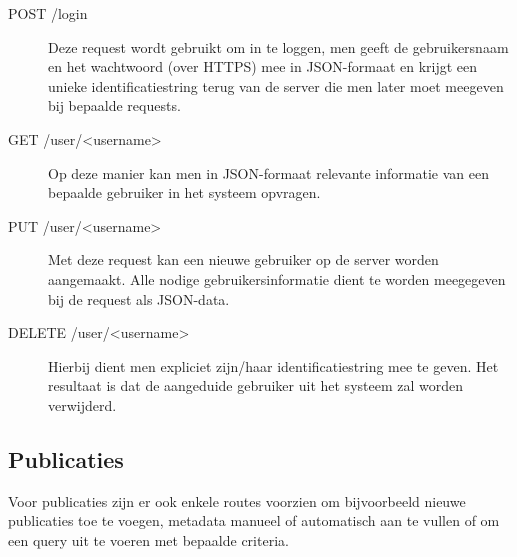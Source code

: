 \documentclass{article}
\begin{document}
\begin{description}

\item[POST /login] Deze request wordt gebruikt om in te loggen, men geeft de gebruikersnaam en het wachtwoord (over HTTPS) mee in JSON-formaat en krijgt een unieke identificatiestring terug van de server die men later moet meegeven bij bepaalde requests.

\item[GET /user/<username>] Op deze manier kan men in JSON-formaat relevante informatie van een bepaalde gebruiker in het systeem opvragen.

\item[PUT /user/<username>] Met deze request kan een nieuwe gebruiker op de server worden aangemaakt. Alle nodige gebruikersinformatie dient te worden meegegeven bij de request als JSON-data.

\item[DELETE /user/<username>] Hierbij dient men expliciet zijn/haar identificatiestring mee te geven. Het resultaat is dat de aangeduide gebruiker uit het systeem zal worden verwijderd.

\end{description}

\subsection{Publicaties} 

Voor publicaties zijn er ook enkele routes voorzien om bijvoorbeeld nieuwe publicaties toe te voegen, metadata manueel of automatisch aan te vullen of om een query uit te voeren met bepaalde criteria.
\end{document}
